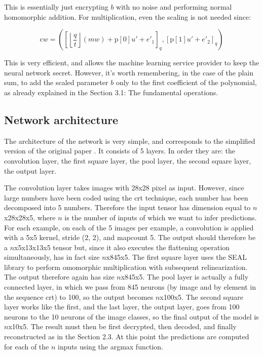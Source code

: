 This is essentially just encrypting $b$ with no noise and performing normal homomorphic addition. For multiplication, even the scaling is not needed since:

\begin{equation*}
    \text{c}w = \left(\left[\left\lfloor\frac{q}{t}\right\rfloor(mw)+\text{p}[0]u'+e'_1\right]_q,[\text{p}[1]u'+e'_2]_q\right) 
\end{equation*}


This is very efficient, and allows the machine learning service provider to keep the neural network secret. However, it's worth remembering, in the case of the plain sum, to add the scaled parameter $b$ only to the first coefficient of the polynomial, as already explained in the Section 3.1: The fundamental operations.

\subsection{Network architecture}

The architecture of the network is very simple, and corresponds to the simplified version of the original paper \cite{dowlin2016cryptonets}. It consists of 5 layers. In order they are: the convolution layer, the first square layer, the pool layer, the second square layer, the output layer.

The convolution layer takes images with 28x28 pixel as input. However, since large numbers have been coded using the crt technique, each number has been decomposed into 5 numbers. Therefore the input tensor has dimension equal to $n$x28x28x5, where $n$ is the number of inputs of which we want to infer predictions. For each example, on each of the 5 images per example, a convolution is applied with a 5x5 kernel, stride (2, 2), and mapcount 5. The output should therefore be a $n$x5x13x13x5 tensor but, since it also executes the flattening operation simultaneously, has in fact size $n$x845x5. The first square layer uses the SEAL library to perform omomorphic multiplication with subsequent relinearization. The output therefore again has size $n$x845x5. The pool layer is actually a fully connected layer, in which we pass from 845 neurons (by image and by element in the sequence crt) to 100, so the output becomes $n$x100x5. The second square layer works like the first, and the last layer, the output layer, goes from 100 neurons to the 10 neurons of the image classes, so the final output of the model is $n$x10x5. The result must then be first decrypted, then decoded, and finally reconstructed as in the Section 2.3. At this point the predictions are computed for each of the $n$ inputs using the argmax function.

